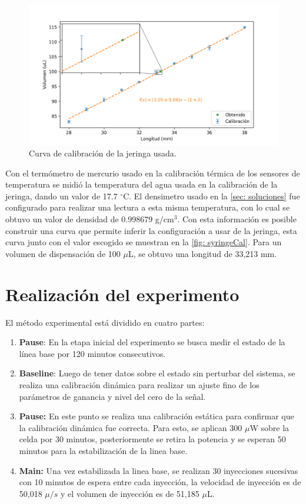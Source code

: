 		\begin{figure}[h]
			\centering
			\includegraphics[width=\linewidth]{../Data/Syringe/syringe_cal.png}
			\caption{Curva de calibraci\'on de la jeringa usada.}
			\label{fig: syringeCal}
		\end{figure}
	
		Con el termómetro de mercurio usado en la calibración térmica de los sensores de temperatura se midió la temperatura del agua usada en la calibración de la jeringa, dando un valor de 17.7 $^\circ$C. El densimetro usado en la \autoref{sec: soluciones} fue configurado para realizar una lectura a esta misma temperatura, con lo cual se obtuvo un valor de densidad de 0.998679 g/cm$^3$. Con esta información es posible construir una curva que permite inferir la configuración a usar de la jeringa, esta curva junto con el valor escogido se muestran en la \autoref{fig: syringeCal}. Para un volumen de dispensación de 100 $\mu$L, se obtuvo una longitud de 33,213 mm.
		\newline
	
\section{Realizaci\'on del experimento}
	El m\'etodo experimental est\'a dividido en cuatro partes:
	\begin{enumerate}
		\item \textbf{Pause}: En la etapa inicial del experimento se busca medir el estado de la línea base por 120 minutos consecutivos.
		\item \textbf{Baseline}: Luego de tener datos sobre el estado sin perturbar del sistema, se realiza una calibración dinámica para realizar un ajuste fino de los parámetros de ganancia y nivel del cero de la señal. 
		\item \textbf{Pause:} En este punto se realiza una calibraci\'on est\'atica para confirmar que la calibraci\'on din\'amica fue correcta. Para esto, se aplican 300 $\mu$W sobre la celda por 30 minutos, posteriormente se retira la potencia y se esperan 50 minutos para la estabilizaci\'on de la linea base.
		\item \textbf{Main:} Una vez estabilizada la linea base, se realizan 30 inyecciones sucesivas con 10 minutos de espera entre cada inyecci\'on, la velocidad de inyecci\'on es de 50,018 $\mu/s$ y el volumen de inyecci\'on es de 51,185 $\mu$L.
	\end{enumerate}

